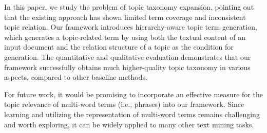 In this paper, we study the problem of topic taxonomy expansion, pointing out that the existing approach has shown limited term coverage and inconsistent topic relation.
Our \proposed framework introduces hierarchy-aware topic term generation, which generates a topic-related term by using both the textual content of an input document and the relation structure of a topic as the condition for generation.
The quantitative and qualitative evaluation demonstrates that our framework successfully obtains much higher-quality topic taxonomy in various aspects, compared to other baseline methods.  

For future work, it would be promising to incorporate an effective measure for the topic relevance of multi-word terms (i.e., phrases) into our framework.
Since learning and utilizing the representation of multi-word terms remains challenging and worth exploring, it can be widely applied to many other text mining tasks.
